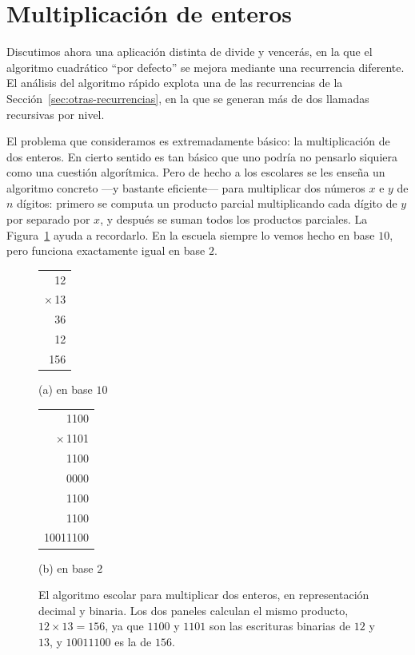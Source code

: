 \documentclass[12pt, spanish, oneside, openany]{book}
\theoremstyle{uprightplain}
\theoremstyle{definition}
\theoremstyle{remark}
\theoremstyle{definition}
\begin{document}
\section{Multiplicación de enteros}
\label{sec:mult-enteros}

Discutimos ahora una aplicación distinta de divide y vencerás, en la que el algoritmo cuadrático ``por defecto'' se mejora mediante una recurrencia diferente. El análisis del algoritmo rápido explota una de las recurrencias de la Sección~\ref{sec:otras-recurrencias}, en la que se generan más de dos llamadas recursivas por nivel.

El problema que consideramos es extremadamente básico: la multiplicación de dos enteros. En cierto sentido es tan básico que uno podría no pensarlo siquiera como una cuestión algorítmica. Pero de hecho a los escolares se les enseña un algoritmo concreto ---y bastante eficiente--- para multiplicar dos números $x$ e $y$ de $n$ dígitos: primero se computa un producto parcial multiplicando cada dígito de $y$ por separado por $x$, y después se suman todos los productos parciales. La Figura~\ref{fig:multiplicacion-escolar} ayuda a recordarlo. En la escuela siempre lo vemos hecho en base $10$, pero funciona exactamente igual en base $2$.

\begin{figure}[H]
\centering
\begin{minipage}[b]{0.34\textwidth}
\centering
\ttfamily
\begin{tabular}{r}
12\\
$\times$\,13\\\hline
36\\
12\phantom{0}\\\hline
156
\end{tabular}

\vspace{4pt}
{\rmfamily\small (a) en base $10$}
\end{minipage}%
\begin{minipage}[b]{0.40\textwidth}
\centering
\ttfamily
\begin{tabular}{r}
1100\\
$\times$\,1101\\\hline
1100\\
0000\phantom{0}\\
1100\phantom{00}\\
1100\phantom{000}\\\hline
10011100
\end{tabular}

\vspace{4pt}
{\rmfamily\small (b) en base $2$}
\end{minipage}
\caption{El algoritmo escolar para multiplicar dos enteros, en representación
decimal y binaria. Los dos paneles calculan el mismo producto,
$12\times 13=156$, ya que $1100$ y $1101$ son las escrituras binarias de $12$ y
$13$, y $10011100$ es la de $156$.}
\label{fig:multiplicacion-escolar}
\end{figure}
\end{document}
